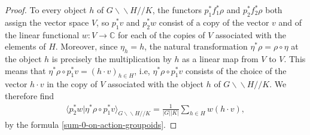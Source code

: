 \documentclass[12pt]{scrartcl}
\theoremstyle{definition}
\numberwithin{equation}{section}
\numberwithin{definition}{section}
\numberwithin{figure}{section}
\begin{document}
\begin{proof}
To every object $h$ of $G\backslash\!\backslash H/\!/K$, the functors $p_1^*f_1^*\rho$ and $p_2^*f_2^*\rho$ both assign the vector space $V$, so $p_1^*v$ and $p_2^*w$ consist of a copy of the vector $v$ and of the linear functional $w\colon V\to \mathbb{C}$ for each of the copies of $V$ associated with the elements of $H$. Moreover, since $\eta_h=h$, the natural transformation $\eta^*\rho=\rho\circ\eta$ at the object $h$ is precisely the multiplication by $h$ as a linear map from $V$ to $V$. This means that $\eta^*\rho\circ p_1^*v=(h\cdot v)_{h\in H}$, i.e, $\eta^*\rho\circ p_1^*v$  consists of the choice of the vector $h\cdot v$ in the copy of $V$ associated with the object $h$ of $G\backslash\!\backslash H/\!/K$. We therefore find
\begin{align*}
\langle p_2^*w|\eta^*\rho\circ p_1^*v\rangle_{G\backslash\!\backslash H/\!/K}=\frac{1}{|G||K|}\sum_{h\in H}w(h\cdot v),
\end{align*}
by the formula \eqref{sum-0-on-action-groupoids}.
\end{proof}
\end{document}
